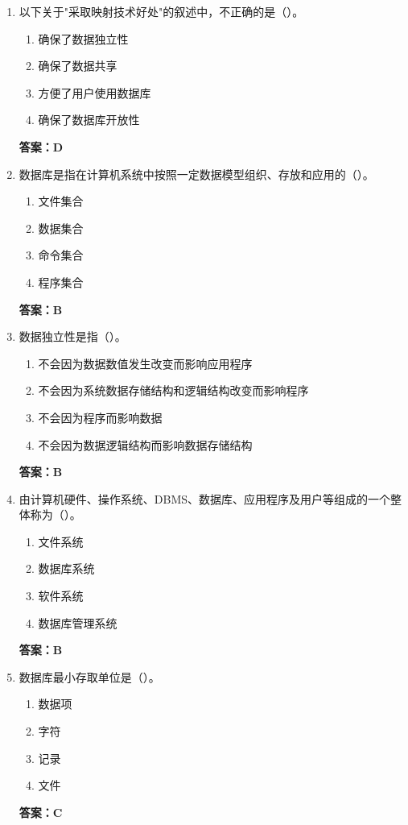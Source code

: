 \documentclass[12pt, a4paper]{article}
\begin{document}
\begin{enumerate}[label=\arabic*.]
	\item 以下关于"采取映射技术好处"的叙述中，不正确的是（\quad）。
	      \begin{enumerate}
		      \item 确保了数据独立性
		      \item 确保了数据共享
		      \item 方便了用户使用数据库
		      \item 确保了数据库开放性
	      \end{enumerate}
	      \textbf{答案：D}

	\item 数据库是指在计算机系统中按照一定数据模型组织、存放和应用的（\quad）。
	      \begin{enumerate}
		      \item 文件集合
		      \item 数据集合
		      \item 命令集合
		      \item 程序集合
	      \end{enumerate}
	      \textbf{答案：B}

	\item 数据独立性是指（\quad）。
	      \begin{enumerate}
		      \item 不会因为数据数值发生改变而影响应用程序
		      \item 不会因为系统数据存储结构和逻辑结构改变而影响程序
		      \item 不会因为程序而影响数据
		      \item 不会因为数据逻辑结构而影响数据存储结构
	      \end{enumerate}
	      \textbf{答案：B}

	\item 由计算机硬件、操作系统、DBMS、数据库、应用程序及用户等组成的一个整体称为（\quad）。
	      \begin{enumerate}
		      \item 文件系统
		      \item 数据库系统
		      \item 软件系统
		      \item 数据库管理系统
	      \end{enumerate}
	      \textbf{答案：B}

	\item 数据库最小存取单位是（\quad）。
	      \begin{enumerate}
		      \item 数据项
		      \item 字符
		      \item 记录
		      \item 文件
	      \end{enumerate}
	      \textbf{答案：C}


\end{enumerate}
\end{document}
